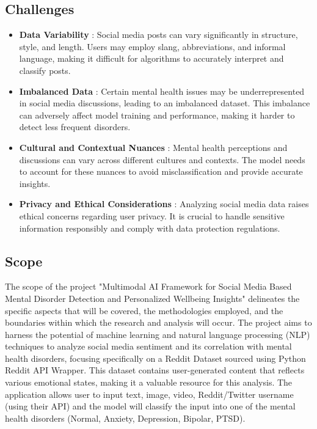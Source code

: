 \subsection{Challenges}
\begin{itemize}
    \item \textbf{Data Variability} :
    \noindent
    Social media posts can vary significantly in structure, style, and length. Users may employ slang, abbreviations, and informal language, making it difficult for algorithms to accurately interpret and classify posts.

    \item \textbf{Imbalanced Data} :
    \noindent
    Certain mental health issues may be underrepresented in social media discussions, leading to an imbalanced dataset. This imbalance can adversely affect model training and performance, making it harder to detect less frequent disorders.

    \item \textbf{Cultural and Contextual Nuances} :
    \noindent
    Mental health perceptions and discussions can vary across different cultures and contexts. The model needs to account for these nuances to avoid misclassification and provide accurate insights.

    \item \textbf{Privacy and Ethical Considerations} :
    \noindent
    Analyzing social media data raises ethical concerns regarding user privacy. It is crucial to handle sensitive information responsibly and comply with data protection regulations.
    
\end{itemize}

\subsection{Scope}
\noindent
The scope of the project "Multimodal AI Framework for Social Media Based Mental Disorder Detection and Personalized Wellbeing Insights" delineates the specific aspects that will be covered, the methodologies employed, and the boundaries within which the research and analysis will occur. The project aims to harness the potential of machine learning and natural language processing (NLP) techniques to analyze social media sentiment and its correlation with mental health disorders, focusing specifically on a Reddit Dataset sourced using Python Reddit API Wrapper. This dataset contains user-generated content that reflects various emotional states, making it a valuable resource for this analysis. The application allows user to input text, image, video, Reddit/Twitter username (using their API) and the model will classify the input into one of the mental health disorders (Normal, Anxiety, Depression, Bipolar, PTSD).

